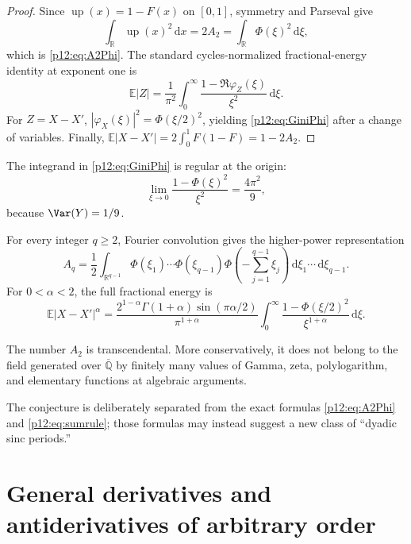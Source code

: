 \documentclass[11pt,oneside]{article}
\theoremstyle{definition}
\theoremstyle{remark}
\newcommand{\F}{F}
\newcommand{\Up}{\operatorname{up}}
\newcommand{\E}{\mathbb E}
\newcommand{\R}{\mathbb R}
\newcommand{\dd}{\,\mathrm d}
\newcommand{\1}{\mathbf 1}
\begin{document}
\begin{proof}
Since \(\Up(x)=1-\F(x)\) on \([0,1]\), symmetry and Parseval give
\[
 \int_{\R}\Up(x)^2\dd x=2A_2
 =\int_{\R}\Phi(\xi)^2\dd\xi,
\]
which is \eqref{p12:eq:A2Phi}.  The standard cycles-normalized fractional-energy
identity at exponent one is
\[
 \E|Z|=\frac1{\pi^2}\int_0^\infty
 \frac{1-\Re\varphi_Z(\xi)}{\xi^2}\dd\xi.
\]
For \(Z=X-X'\),
\(|\varphi_X(\xi)|^2=\Phi(\xi/2)^2\), yielding \eqref{p12:eq:GiniPhi} after a
change of variables.  Finally,
\(\E|X-X'|=2\int_0^1\F(1-\F)=1-2A_2\).
\end{proof}

The integrand in \eqref{p12:eq:GiniPhi} is regular at the origin:
\begin{equation}
 \lim_{\xi\to0}\frac{1-\Phi(\xi)^2}{\xi^2}=\frac{4\pi^2}{9},
\end{equation}
because \(\Var(Y)=1/9\).

For every integer \(q\ge2\), Fourier convolution gives the higher-power
representation
\begin{equation}\label{p12:eq:AqFourier}
 A_q=\frac12\int_{\R^{q-1}}
 \Phi(\xi_1)\cdots\Phi(\xi_{q-1})
 \Phi\!\left(-\sum_{j=1}^{q-1}\xi_j\right)
 \dd\xi_1\cdots\dd\xi_{q-1}.
\end{equation}
For \(0<\alpha<2\), the full fractional energy is
\begin{equation}\label{p12:eq:fractionalenergy}
 \E|X-X'|^\alpha
 =\frac{2^{1-\alpha}\Gamma(1+\alpha)\sin(\pi\alpha/2)}
 {\pi^{1+\alpha}}
 \int_0^\infty\frac{1-\Phi(\xi/2)^2}{\xi^{1+\alpha}}\dd\xi.
\end{equation}

\begin{conjecture}
The number \(A_2\) is transcendental.  More conservatively, it does not belong
to the field generated over \(\overline{\mathbb Q}\) by finitely many values of
Gamma, zeta, polylogarithm, and elementary functions at algebraic arguments.
\end{conjecture}

The conjecture is deliberately separated from the exact formulas
\eqref{p12:eq:A2Phi} and \eqref{p12:eq:sumrule}; those formulas may instead suggest a
new class of ``dyadic sinc periods.''

\section{General derivatives and antiderivatives of arbitrary order}
\end{document}
